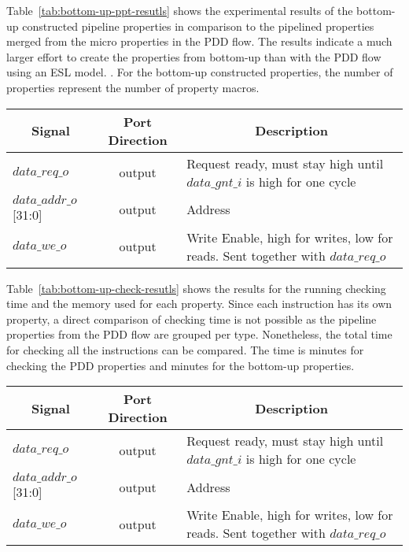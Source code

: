 Table~\ref{tab:bottom-up-ppt-resutls} shows the experimental results of the bottom-up constructed pipeline properties in comparison to the pipelined properties merged from the micro properties in the PDD flow. The results indicate a much larger effort to create the properties from bottom-up than with the PDD flow using an ESL model. . For the bottom-up constructed properties, the number of properties represent the number of property macros. 

\begin{table*}[htb!] 
	\centering 
	\caption{LSU port signals of RI5CY processor\cite{manual-ri5cy}.} 
	\label{tab:bottom-up-ppt-resutls}
	\begin{tabular}{l|c|p{7cm}} 
		\multicolumn{1}{c}{\bfseries Signal} & \multicolumn{1}{c}{\bfseries Port Direction} & \multicolumn{1}{c}{\bfseries Description} \\     
		\hline	
		$data\_req\_o$  &  output & Request ready, must stay high until $data\_gnt\_i$ is        high for one cycle \\
		\hline
		$data\_addr\_o$[31:0]  &  output & Address \\
		\hline
		$data\_we\_o$  &  output & Write Enable, high for writes, low for reads. Sent            together with $data\_req\_o$ \\
	\end{tabular} 
\end{table*}

Table~\ref{tab:bottom-up-check-resutls} shows the results for the running checking time and the memory used for each property. Since each instruction has its own property, a direct comparison of checking time is not possible as the pipeline properties from the PDD flow are grouped per type. Nonetheless, the total time for checking all the instructions can be compared. The time is  minutes for checking the PDD properties and  minutes for the bottom-up properties.

\begin{table*}[htb!] 
	\centering 
	\caption{LSU port signals of RI5CY processor\cite{manual-ri5cy}.} 
	\label{tab:bottom-up-check-resutls}
	\begin{tabular}{l|c|p{7cm}} 
		\multicolumn{1}{c}{\bfseries Signal} & \multicolumn{1}{c}{\bfseries Port Direction} & \multicolumn{1}{c}{\bfseries Description} \\     
		\hline	
		$data\_req\_o$  &  output & Request ready, must stay high until $data\_gnt\_i$ is        high for one cycle \\
		\hline
		$data\_addr\_o$[31:0]  &  output & Address \\
		\hline
		$data\_we\_o$  &  output & Write Enable, high for writes, low for reads. Sent            together with $data\_req\_o$ \\
	\end{tabular} 
\end{table*}
